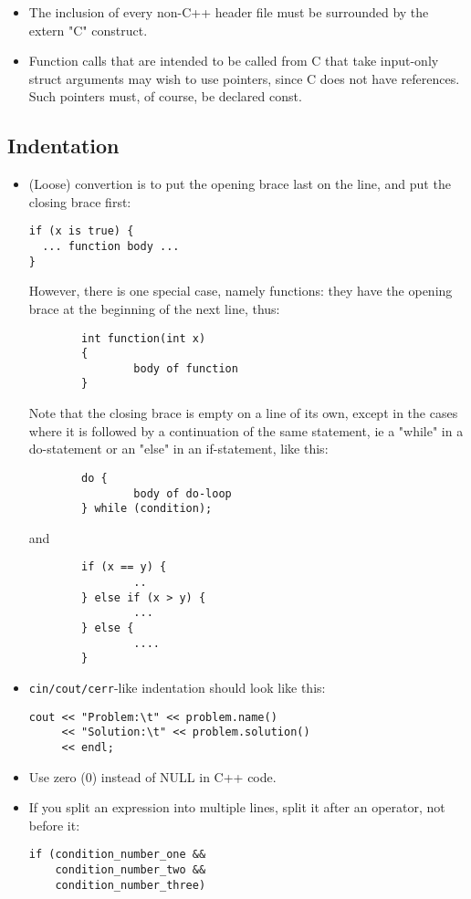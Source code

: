 \documentclass[10pt,letter,relax]{SANDreport}
\begin{document}
\begin{itemize}
\item The inclusion of every non-C++ header file must be surrounded by
  the extern "C" { } construct.
\item Function calls that are intended to be called from C that take input-only struct arguments may wish to use pointers, since C does not have references. Such pointers must, of course, be declared const.
\end{itemize}

\subsection{Indentation}

\begin{itemize}
\item (Loose) convertion is to put the opening
brace last on the line, and put the closing brace first:
\begin{verbatim}
if (x is true) {
  ... function body ...
}
\end{verbatim}
However, there is one special case, namely functions: they have the
opening brace at the beginning of the next line, thus:
\begin{verbatim}
        int function(int x)
        {
                body of function
        }
\end{verbatim}

Note that the closing brace is empty on a line of its own, except in
the cases where it is followed by a continuation of the same statement,
ie a "while" in a do-statement or an "else" in an if-statement, like
this:
\begin{verbatim}
        do {
                body of do-loop
        } while (condition);
\end{verbatim}
and
\begin{verbatim}
        if (x == y) {
                ..
        } else if (x > y) {
                ...
        } else {
                ....
        }
\end{verbatim}
\item \verb!cin/cout/cerr!-like indentation should look like this:
\begin{verbatim}
cout << "Problem:\t" << problem.name()
     << "Solution:\t" << problem.solution()
     << endl;
\end{verbatim}
\item Use zero (0) instead of NULL in C++ code.
\item If you split an expression into multiple lines, split it after an operator, not before it:
\begin{verbatim}
if (condition_number_one &&
    condition_number_two &&
    condition_number_three)
\end{verbatim}
\end{itemize}
\end{document}
